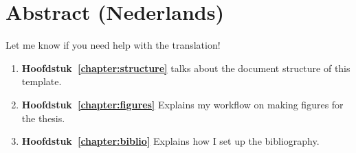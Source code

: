 \chapter*{Abstract (Nederlands)} \label{chapter:abstract_nederlands}

Let me know if you need help with the translation!

\begin{enumerate}[]
\vfill
\item \textbf{Hoofdstuk~\ref{chapter:structure}} talks about the document structure of this template.
\vfill
\item \textbf{Hoofdstuk~\ref{chapter:figures}} Explains my workflow on making figures for the thesis.
\vfill
\item \textbf{Hoofdstuk~\ref{chapter:biblio}} Explains how I set up the bibliography.
\vfill
\end{enumerate}
